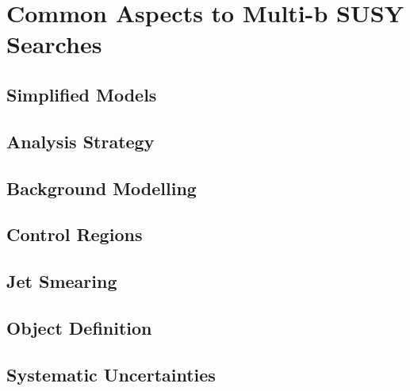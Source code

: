 \chapter{Common Aspects to Multi-b SUSY Searches}
\label{chap:multib_general}

\section{Simplified Models}

\section{Analysis Strategy}

\section{Background Modelling}

\section{Control Regions}

\section{Jet Smearing}

\section{Object Definition}

\section{Systematic Uncertainties}